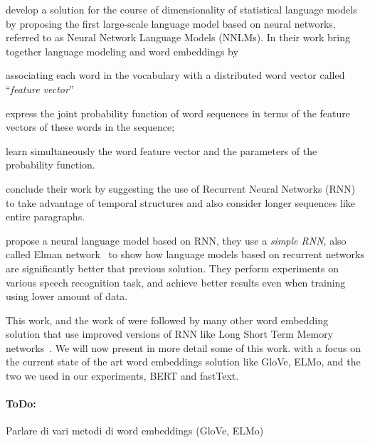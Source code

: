 \citet{bengio2003nnlm} develop a solution for the course of dimensionality of statistical language models by proposing the first large-scale language model based on neural networks, referred to as Neural Network Language Models (NNLMs). In their work \citet{bengio2003nnlm} bring together language modeling and word embeddings by \begin {enumerate*} [1) ]%
\item associating each word in the vocabulary with a distributed word vector called ``\textit{feature vector}'' \item express the joint probability function of word sequences in terms of the feature vectors of these words in the sequence; \item learn simultaneously the word feature vector and the parameters of the probability function.
\end {enumerate*} \citet{bengio2003nnlm} conclude their work by suggesting the use of 
Recurrent Neural Networks (RNN) to take advantage of temporal structures and also consider longer sequences like entire paragraphs.

\citet{Mikolov2010RecurrentNN} propose a neural language model based on RNN, they use a \textit{simple RNN}, also called Elman network~\citep{elman1990finding} to show how language models based on recurrent networks are significantly better that previous solution. They perform experiments on various speech recognition task, and achieve better results even when training using lower amount of data. 

This work, and the work of \cite{bengio2003nnlm} were followed by many other word embedding solution that use improved versions of RNN like Long Short Term Memory networks~\citep{hochreiter1997long}. We will now present in more detail some of this work. with a focus on the current state of the art word embeddings solution like GloVe, ELMo, and the two we used in our experiments, BERT and fastText.






\paragraph{ToDo:} Parlare di vari metodi di word embeddings (GloVe, ELMo)

